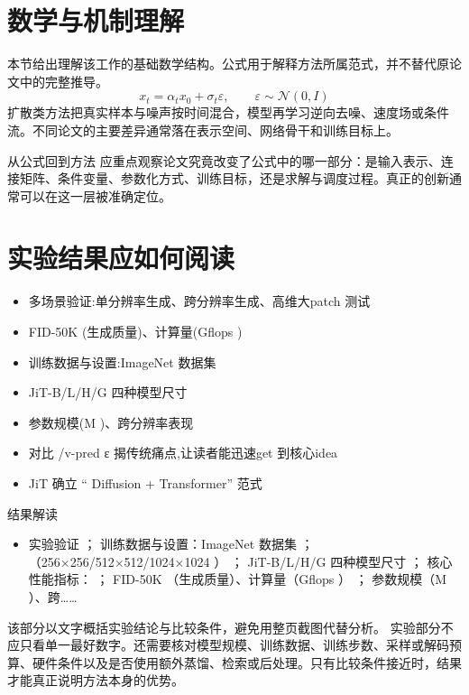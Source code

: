 \documentclass[UTF8,11pt,a4paper]{ctexart}
\begin{document}
\section{数学与机制理解}
本节给出理解该工作的基础数学结构。公式用于解释方法所属范式，并不替代原论文中的完整推导。
\begin{equation}
x_t=\alpha_t x_0+\sigma_t\varepsilon,\qquad \varepsilon\sim\mathcal N(0,I)
\end{equation}
扩散类方法把真实样本与噪声按时间混合，模型再学习逆向去噪、速度场或条件流。不同论文的主要差异通常落在表示空间、网络骨干和训练目标上。

\begin{keybox}{从公式回到方法}
应重点观察论文究竟改变了公式中的哪一部分：是输入表示、连接矩阵、条件变量、参数化方式、训练目标，还是求解与调度过程。真正的创新通常可以在这一层被准确定位。
\end{keybox}


\section{实验结果应如何阅读}
\begin{itemize}
\item 多场景验证:单分辨率生成、跨分辨率生成、高维大patch 测试
\item FID-50K (生成质量)、计算量(Gflops )
\item 训练数据与设置:ImageNet 数据集
\item JiT-B/L/H/G 四种模型尺寸
\item 参数规模(M )、跨分辨率表现
\item 对比 /v-pred ε 揭传统痛点,让读者能迅速get 到核心idea
\item JiT 确立 “ Diffusion + Transformer” 范式
\end{itemize}

\begin{notebox}{结果解读}
\begin{itemize}
\item 实验验证 ； 训练数据与设置：ImageNet 数据集 ； （256×256/512×512/1024×1024 ） ； JiT-B/L/H/G 四种模型尺寸 ； 核心性能指标： ； FID-50K （生成质量）、计算量（Gflops ） ； 参数规模（M ）、跨……
\end{itemize}
\end{notebox}

该部分以文字概括实验结论与比较条件，避免用整页截图代替分析。
实验部分不应只看单一最好数字。还需要核对模型规模、训练数据、训练步数、采样或解码预算、硬件条件以及是否使用额外蒸馏、检索或后处理。只有比较条件接近时，结果才能真正说明方法本身的优势。
\end{document}
